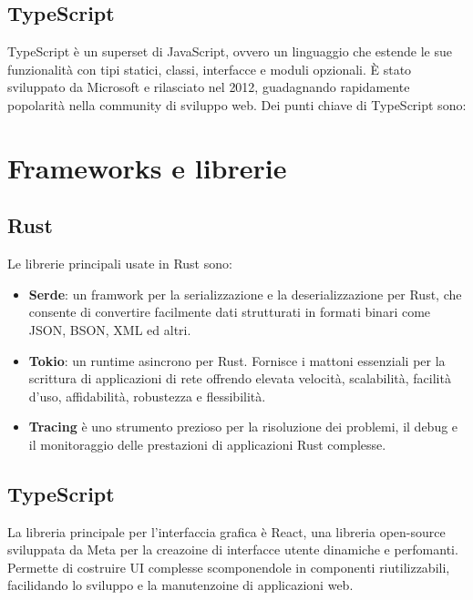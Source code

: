 \documentclass[target=bach,aauheader=,style=]{thud}
\begin{document}
\subsection{TypeScript}
TypeScript è un superset di JavaScript, ovvero un linguaggio che estende le sue funzionalità con tipi statici, classi, interfacce e moduli opzionali. È stato sviluppato da Microsoft e rilasciato nel 2012, guadagnando rapidamente popolarità nella community di sviluppo web.
Dei punti chiave di TypeScript sono:


\section{Frameworks e librerie}
\subsection{Rust}
Le librerie principali usate in Rust sono:
\begin{itemize}
  \item \textbf{Serde}: un framwork per la serializzazione e la deserializzazione per Rust, che consente di convertire facilmente dati strutturati in formati binari come JSON, BSON, XML ed altri. 
  \item \textbf{Tokio}: un runtime asincrono per Rust. Fornisce i mattoni essenziali per la scrittura di applicazioni di rete offrendo elevata velocità, scalabilità, facilità d'uso, affidabilità, robustezza e flessibilità.
  \item \textbf{Tracing} è uno strumento prezioso per la risoluzione dei problemi, il debug e il monitoraggio delle prestazioni di applicazioni Rust complesse.
\end{itemize}

\subsection{TypeScript}
La libreria principale per l'interfaccia grafica è React, una libreria open-source sviluppata da Meta per la creazoine di interfacce utente dinamiche e perfomanti. 
Permette di costruire UI complesse scomponendole in componenti riutilizzabili, facilidando lo sviluppo e la manutenzoine di applicazioni web.
\end{document}
